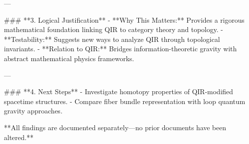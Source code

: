 ---

### **3. Logical Justification**
- **Why This Matters:** Provides a rigorous mathematical foundation linking QIR to category theory and topology.
- **Testability:** Suggests new ways to analyze QIR through topological invariants.
- **Relation to QIR:** Bridges information-theoretic gravity with abstract mathematical physics frameworks.

---

### **4. Next Steps**
- Investigate homotopy properties of QIR-modified spacetime structures.
- Compare fiber bundle representation with loop quantum gravity approaches.

**All findings are documented separately—no prior documents have been altered.**

